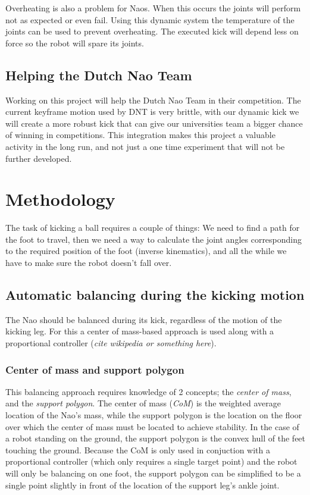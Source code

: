 \documentclass[a4paper]{article}
\begin{document}
Overheating is also a problem for Naos. When this occurs the joints will perform
not as expected or even fail. Using this dynamic system the temperature of the
joints can be used to prevent overheating. The executed kick will depend less
on force so the robot will spare its joints.


\subsection{Helping the Dutch Nao Team}
 Working on this project will help the Dutch Nao Team in their competition. The
current keyframe motion used by DNT is very brittle, with our dynamic kick we will create a
more robust kick that can give our universities team a bigger chance of
winning in competitions. 
This integration makes this project a valuable activity in the long run, and not
just a one time experiment that will not be further developed.

\section{Methodology}
The task of kicking a ball requires a couple of things: We need to find a path
for the foot to travel, then we need a way to calculate the joint angles
corresponding to the required position of the foot (inverse kinematics), and all
the while we have to make sure the robot doesn't fall over.

\subsection{Automatic balancing during the kicking motion}
The Nao should be balanced during its kick, regardless of the motion of the
kicking leg. For this a center of mass-based approach is used along with a
proportional controller (\emph{cite wikipedia or something here}).

\subsubsection{Center of mass and support polygon}
This balancing approach requires knowledge of 2 concepts; the \emph{center of mass},
and the \emph{support polygon}. The center of mass (\emph{CoM}) is the weighted average
location of the Nao’s mass, while the support polygon is the location on the
floor over which the center of mass must be located to achieve stability. In the
case of a robot standing on the ground, the support polygon is the convex hull
of the feet touching the ground. Because the CoM is only used in conjuction with
a proportional controller (which only requires a single target point) and the
robot will only be balancing on one foot, the support polygon can be simplified
to be a single point slightly in front of the location of the support leg's ankle
joint.
\end{document}
